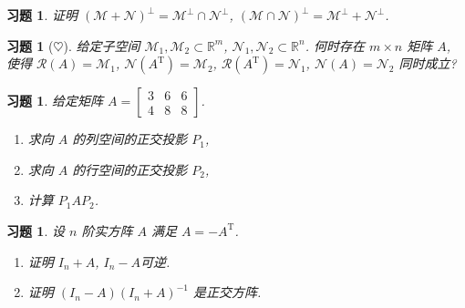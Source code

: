 \documentclass[UTF8]{ctexart}
\newtheorem{ex}[thm]{习题}
\begin{document}
\begin{ex}
  证明 \((\mathcal{M}+\mathcal{N})^{\perp} = \mathcal{M}^{\perp} \cap \mathcal{N}^{\perp}\), \((\mathcal{M}\cap \mathcal{N})^{\perp} = \mathcal{M}^{\perp} + \mathcal{N}^{\perp}\).
\end{ex}

\begin{ex}[\(\heartsuit\)]
  给定子空间 \(\mathcal{M}_{1}, \mathcal{M}_{2} \subset \mathbb{R}^{m}\), \(\mathcal{N}_{1}, \mathcal{N}_{2} \subset \mathbb{R}^{n}\).
何时存在 \(m \times n\) 矩阵 \(A\), 使得
\(\mathcal{R}(A) = \mathcal{M}_{1}\), \(\mathcal{N}(A^{\mathrm{T}})=\mathcal{M}_{2}\), \(\mathcal{R}(A^{\mathrm{T}})=\mathcal{N}_{1}\), \(\mathcal{N}(A) = \mathcal{N}_{2}\)
同时成立?
\end{ex}


\begin{ex}
  给定矩阵 \(A = \begin{bmatrix} 3 & 6 & 6 \\ 4 & 8 & 8\end{bmatrix}\).
  \begin{enumerate}
  \item 求向 \(A\) 的列空间的正交投影 \(P_{1}\),
  \item 求向 \(A\) 的行空间的正交投影 \(P_{2}\),
  \item 计算 \(P_{1}AP_{2}\).
  \end{enumerate}
\end{ex}


\begin{ex}
  设 \(n\) 阶实方阵 \(A\) 满足 \(A = -A^{\mathrm{T}}\).
  \begin{enumerate}
  \item 证明 \(I_{n}+A\), \(I_n-A\)可逆.
  \item 证明 \((I_{n}-A)(I_{n}+A)^{-1}\) 是正交方阵.
  \end{enumerate}
\end{ex}
\end{document}

